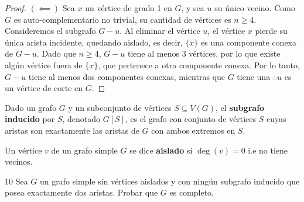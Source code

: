 \begin{proof}
    \( (\impliedby) \) Sea \( x \) un vértice de grado 1 en \( G \), y sea \( u \) su único vecino.
    Como \( G \) es auto-complementario no trivial, su cantidad de vértices es \( n \ge 4 \).
    Consideremos el subgrafo \( G - u \). Al eliminar el vértice \( u \), el vértice \( x \) pierde su única arista incidente, quedando aislado, es decir, \( \{ x \} \) es una componente conexa de \( G - u \).
    Dado que \( n \ge 4 \), \( G - u \) tiene al menos \( 3 \) vértices, por lo que existe algún vértice fuera de \( \{ x \} \), que pertenece a otra componente conexa. Por lo tanto, \( G - u \) tiene al menos dos componentes conexas, mientras que \( G \) tiene una \( \therefore u \) es un vértice de corte en \( G \).
\end{proof}

\clearpage

\begin{definition}
    Dado un grafo \( G \) y un subconjunto de vértices \( S \subseteq V(G) \), el \textbf{subgrafo inducido} por \( S \), denotado \( G[S] \), es el grafo con conjunto de vértices \( S \) cuyas aristas son exactamente las aristas de \( G \) con ambos extremos en \( S \).
\end{definition}

\begin{definition}
    Un vértice \( v \) de un grafo simple \( G \) se dice \textbf{aislado} si \( \deg(v) = 0 \) i.e no tiene vecinos.
\end{definition}

\begin{ejercicioEntregar}{10}
    Sea \( G \) un grafo simple sin vértices aislados y con ningún subgrafo inducido que posea exactamente dos aristas. Probar que \( G \) es completo.
\end{ejercicioEntregar}

